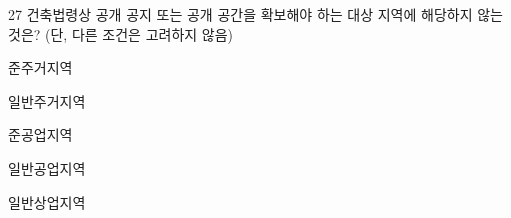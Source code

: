 \begin{question}{27}
건축법령상 공개 공지 또는 공개 공간을 확보해야 하는 대상 지역에 해당하지 않는 것은? (단, 다른 조건은 고려하지 않음)
\begin{choices}
  \item 준주거지역
  \item 일반주거지역
  \item 준공업지역
  \item 일반공업지역
  \item 일반상업지역
\end{choices}
\end{question}
